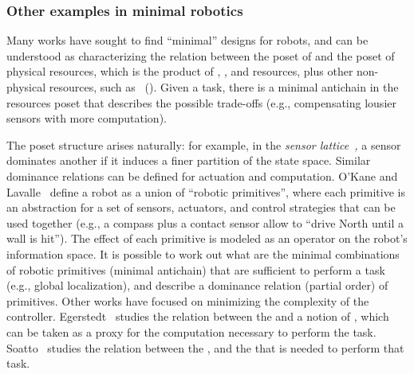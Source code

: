 \subsubsection*{Other examples in minimal robotics}

Many works have sought to find ``minimal'' designs for robots, and
can be understood as characterizing the relation between the poset
of  and the poset of physical resources, which is the product
of , , and  resources,
plus other non-physical resources, such as ~().
Given a task, there is a minimal antichain in the resources poset
that describes the possible trade-offs (e.g., compensating lousier
sensors with more computation). 


The poset structure arises naturally: for example, in the \emph{sensor
lattice}~\cite{lavalle12sensing}\emph{,} a sensor dominates another
if it induces a finer partition of the state space. Similar dominance
relations can be defined for actuation and computation. O'Kane and
Lavalle~\cite{okane08comparing} define a robot as a union of ``robotic
primitives'', where each primitive is an abstraction for a set of
sensors, actuators, and control strategies that can be used together
(e.g., a compass plus a contact sensor allow to ``drive North until
a wall is hit''). The effect of each primitive is modeled as an operator
on the robot's information space. It is possible to work out what
are the minimal combinations of robotic primitives (minimal antichain)
that are sufficient to perform a task (e.g., global localization),
and describe a dominance relation (partial order) of primitives. Other
works have focused on minimizing the complexity of the controller.
Egerstedt~\cite{egerstedt03motion} studies the relation between
the  and a notion of , which can be taken as
a proxy for the computation necessary to perform the task. Soatto~\cite{soatto11steps}
studies the relation between the ,
and the  that is needed to perform that
task. 

